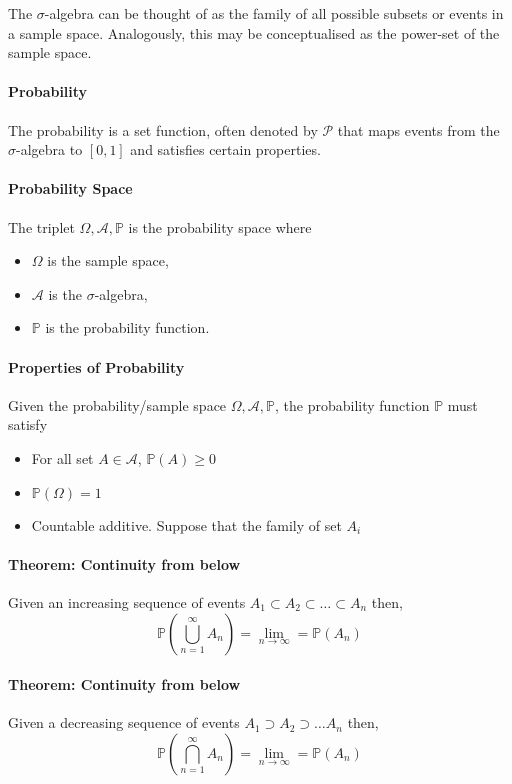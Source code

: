 The \(\sigma\)-algebra can be thought of as the family of all possible
subsets or events in a sample space. Analogously, this may be
conceptualised as the power-set of the sample space.

\paragraph {Probability}
The probability is a set function, often denoted by \(\mathcal{P}\) that maps events from
the \(\sigma\)-algebra to \([0, 1]\) and satisfies certain properties.

\paragraph{Probability Space}
The triplet \(\Omega, \mathcal{A}, \mathbb{P}\) is the probability space where
\begin{itemize}
    \item \(\Omega\) is the sample space,
    \item \(\mathcal{A}\) is the \(\sigma\)-algebra,
    \item \(\mathbb{P}\) is the probability function.
\end{itemize}

\paragraph {Properties of Probability}
Given the probability/sample space \(\Omega, \mathcal{A}, \mathbb{P}\), the probability
function \(\mathbb{P}\) must satisfy
\begin{itemize}
    \item For all set \(A\in \mathcal{A}\), \(\mathbb{P}(A) \geq 0\)
    \item \(\mathbb{P}(\Omega) = 1\) 
    \item Countable additive. Suppose that the family of set \(A_i\) %
\end{itemize}

\paragraph {Theorem: Continuity from below}
Given an increasing sequence of events \(A_1 \subset A_2 \subset \dots \subset A_n\)
then, \[
    \mathbb{P}\left(
        \bigcup_{n=1}^{\infty} A_n
    \right)
    =
    \lim_{n\to\infty} = \mathbb{P} (A_n)
\]

\paragraph {Theorem: Continuity from below}
Given a decreasing sequence of events \(A_1 \supset A_2 \supset \dots A_n\)
then, \[
    \mathbb{P}\left(
        \bigcap_{n=1}^{\infty} A_n
    \right)
    =
    \lim_{n\to\infty} = \mathbb{P} (A_n)
\]

